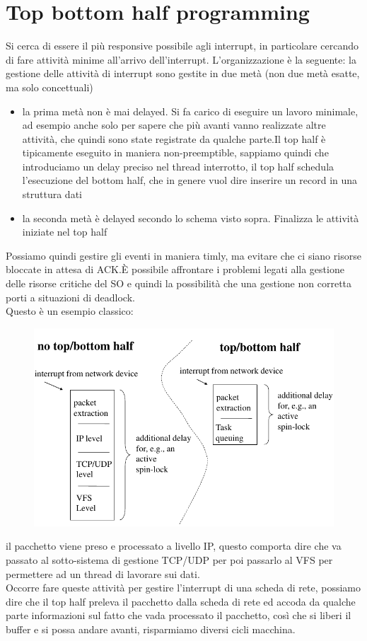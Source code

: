 \documentclass[12pt, oneside]{extbook}
\begin{document}
\section{Top bottom half programming}
Si cerca di essere il più responsive possibile agli interrupt, in particolare cercando di fare attività minime all'arrivo dell'interrupt. L'organizzazione è la seguente: la gestione delle attività di interrupt sono gestite in due metà (non due metà esatte, ma solo concettuali)
\begin{itemize}
\item la prima metà non è mai delayed. Si fa carico di eseguire un lavoro minimale, ad esempio anche solo per sapere che più avanti vanno realizzate altre attività, che quindi sono state registrate da qualche parte.Il top half è tipicamente eseguito in maniera non-preemptible, sappiamo quindi che introduciamo un delay preciso nel thread interrotto, il top half schedula l'esecuzione del bottom half, che in genere vuol dire inserire un record in una struttura dati
\item la seconda metà è delayed secondo lo schema visto sopra. Finalizza le attività iniziate nel top half
\end{itemize}
Possiamo quindi gestire gli eventi in maniera timly, ma evitare che ci siano risorse bloccate in attesa di ACK.È possibile affrontare i problemi legati alla gestione delle risorse critiche del SO e quindi la possibilità che una gestione non corretta porti a situazioni di deadlock.\\Questo è un esempio classico:
\begin{figure}[!h]
	\includegraphics[scale=0.4]{immagini/tbh_network.png}
\end{figure}
il pacchetto viene preso e processato a livello IP, questo comporta dire che va passato al sotto-sistema di gestione TCP/UDP per poi passarlo al VFS per permettere ad un thread di lavorare sui dati.\\Occorre fare queste attività per gestire l'interrupt di una scheda di rete, possiamo dire che il top half preleva il pacchetto dalla scheda di rete ed accoda da qualche parte informazioni sul fatto che vada processato il pacchetto, così che si liberi il buffer e si possa andare avanti, risparmiamo diversi cicli macchina.\\
\end{document}
